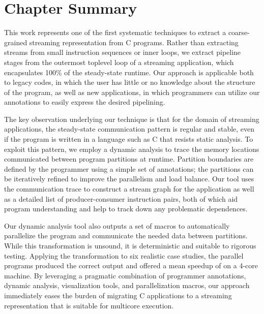 \section{Chapter Summary}
\label{sec:conclusions}

This work represents one of the first systematic techniques to extract
a coarse-grained streaming representation from C programs.  Rather
than extracting streams from small instruction sequences or inner
loops, we extract pipeline stages from the outermost toplevel loop of
a streaming application, which encapsulates 100\% of the steady-state
runtime.  Our approach is applicable both to legacy codes, in which
the user has little or no knowledge about the structure of the
program, as well as new applications, in which programmers can utilize
our annotations to easily express the desired pipelining.

The key observation underlying our technique is that for the domain of
streaming applications, the steady-state communication pattern is
regular and stable, even if the program is written in a language such
as C that resists static analysis.  To exploit this pattern, we employ
a dynamic analysis to trace the memory locations communicated between
program partitions at runtime.  Partition boundaries are defined by
the programmer using a simple set of annotations; the partitions can
be iteratively refined to improve the parallelism and load balance.
Our tool uses the communication trace to construct a stream graph for
the application as well as a detailed list of producer-consumer
instruction pairs, both of which aid program understanding and help to
track down any problematic dependences.

Our dynamic analysis tool also outputs a set of macros to
automatically parallelize the program and communicate the needed data
between partitions.  While this transformation is unsound, it is
deterministic and suitable to rigorous testing.  Applying the
transformation to six realistic case studies, the parallel programs
produced the correct output and offered a mean speedup of
{\meanspeedup} on a 4-core machine.
By leveraging a pragmatic combination of programmer annotations,
dynamic analysis, visualization tools, and parallelization macros, our
approach immediately eases the burden of migrating C applications to a
streaming representation that is suitable for multicore execution.
